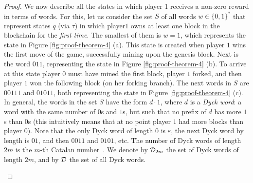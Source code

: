 \begin{proof}
We now describe all the states in which player 1 receives a non-zero reward in terms of words. For this, let us consider the set $S$ of all words $w \in \{0,1\}^*$ that represent states $q$ (via $\tau$) in which player$1$ owns at least one block in the blockchain for the {\em first time}. 
The smallest of them is $w = 1$, which represents the state in Figure \ref{fig:proof-theorem-4} (a). This state is created when player $1$ wins the first move of the game, successfully mining upon the genesis block. Next is the word $011$, representing the state in Figure \ref{fig:proof-theorem-4} (b). To arrive at this state player $0$ must have mined the first block, player $1$ forked, and then player $1$ 
won the following block (on her forking branch). The next words in $S$ are $00111$ and $01011$, both representing the state in Figure \ref{fig:proof-theorem-4} (c). 
In general, the words in the set $S$ have the form $d\cdot 1$, where $d$ is a \emph{Dyck word}: a word with the same number of $0$s and $1$s, but such that 
no prefix of $d$ has more $1$s than $0$s (this intuitively means that at no point player $1$ had more blocks than player $0$). Note that the only Dyck word of length $0$ is $\varepsilon$, the next Dyck word by length is $01$, and then $0011$ and $0101$, etc. The number of Dyck words of length $2m$ is the $m$-th Catalan number~\cite{stanley2015catalan}. We denote by $\Dyck_{2m}$ the set of Dyck words of length $2m$, and by $\Dyck$ the set of all Dyck words.

\begin{figure}
%
%
%
%
%	
%
%
%	
%	
%
\centering
\begin{tikzpicture}[->,>=stealth',auto,thick, scale = 0.61,state/.style={circle,inner sep=2pt}]


\end{tikzpicture}
\end{figure}
\end{proof}
